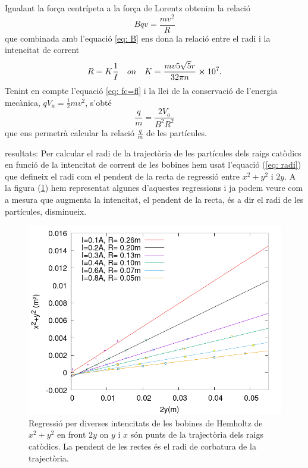 \documentclass[11pt]{article}
\begin{document}
Igualant la força centrípeta a la força de Lorentz obtenim la relació 
\begin{equation}
    Bqv=\frac{mv^2}{R}
    \label{eq: fc=fl}
\end{equation}
que combinada amb l'equació \ref{eq: B} ens dona la relació entre el radi i la intencitat de corrent
\begin{equation}
    R=K\frac{1}{I} \quad on \quad K=\frac{mv5\sqrt{5}r}{32\pi n}\cross 10^7.
    \label{eq: IvsR}
\end{equation}
Tenint en compte l'equació \ref{eq: fc=fl} i la llei de la conservació de l'energia mecànica, $qV_a = \frac{1}{2}mv^2$, s'obté 
\begin{equation}
    \frac{q}{m}=\frac{2V_a }{B^2R^2}
    \label{eq: q/m}
\end{equation}
que ens permetrà calcular la relació $\frac{q}{m}$ de les partícules.

resultats:
Per calcular el radi de la trajectòria de les partícules dels raigs catòdics en funció de la intencitat de corrent de les bobines hem usat l'equació (\ref{eq: radi}) que defineix el radi com el pendent de la recta de regressió entre $x^2+y^2$ i $2y$. A la figura (\ref{fig: regressio_1}) hem representat algunes d'aquestes regressions i ja podem veure com a mesura que augmenta la intencitat, el pendent de la recta, és a dir el radi de les partícules, disminueix. 
\begin{figure}[H]
    \centering
    \includegraphics[scale=0.3]{regressio_1.png}
    \caption{Regressió per diverses intencitats de les bobines de Hemholtz de $x^2+y^2$ en front $2y$ on $y$ i $x$ són punts de la trajectòria dels raigs catòdics. La pendent de les rectes és el radi de corbatura de la trajectòria.}
    \label{fig: regressio_1}
\end{figure}
\end{document}
